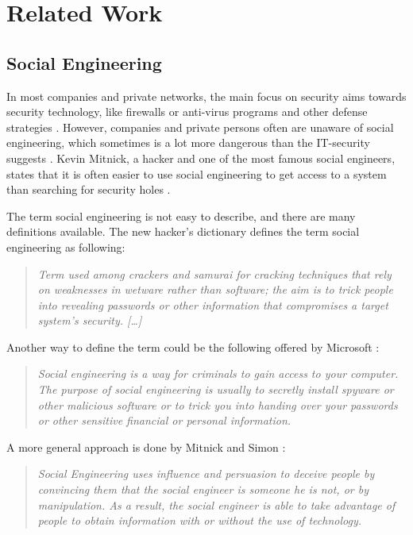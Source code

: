 \chapter{Related Work}
\label{chapter:relatedwork}

\section{Social Engineering}

In most companies and private networks, the main focus on security aims towards
security technology, like firewalls or anti-virus programs and other defense
strategies \cite{winkler1995}. However, companies and private persons often are unaware of social
engineering, which sometimes is a lot more dangerous than the IT-security
suggests \cite{jones2004}. Kevin Mitnick, a hacker and one of the most famous social
engineers, states that it is often easier to use social engineering to get
access to a system than searching for security holes \cite{mitnick2003}.

The term social engineering is not easy to describe, and there are many
definitions available. 
The new hacker's dictionary \cite{raymond1996} defines the term social engineering as
following:
\begin{quote}
\textit{Term used among crackers and samurai for cracking techniques that rely on
weaknesses in wetware rather than software; the aim is to trick people into
revealing passwords or other information that compromises a target system's
security. [\dots]}
\end{quote}

Another way to define the term could be the following offered by Microsoft
\cite{microsoft2009}:
\begin{quote}
\textit{Social engineering is a way for criminals to gain access to your computer. The
purpose of social engineering is usually to secretly install spyware or other
malicious software or to trick you into handing over your passwords or other
sensitive financial or personal information.}
\end{quote}

A more general approach is done by Mitnick and Simon \cite{mitnick2003}:
\begin{quote}
\textit{Social Engineering uses influence and persuasion to deceive people
by convincing them that the social engineer is someone he is not,
or by manipulation. As a result, the social engineer is able to take
advantage of people to obtain information with or without the use of
technology.}
\end{quote}

